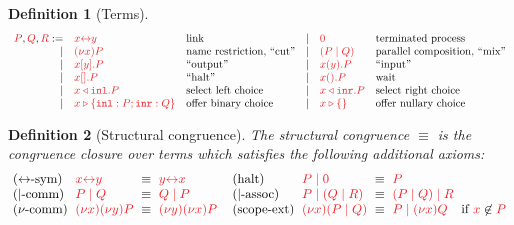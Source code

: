 \documentclass[draft,submission,copyright,creativecommons]{eptcs}
\newtheorem{definition}{Definition}
\begin{document}
\begin{definition}[Terms]\label{def:hcp-terms}
  \[
    \begin{array}{rllrll}
      \tm{P}, \tm{Q}, \tm{R}
           :=& \tm{\cpLink{x}{y}}         &\text{link}
      &  \mid& \tm{\piHalt}               &\text{terminated process}
      \\ \mid& \tm{\piNew{x}{P}}          &\text{name restriction, ``cut''}
      &  \mid& \tm{( \piPar{P}{Q} )}      &\text{parallel composition, ``mix''}
      \\ \mid& \tm{\piBoundSend{x}{y}{P}} &\text{``output''}
      &  \mid& \tm{\piRecv{x}{y}{P}}      &\text{``input''}
      \\ \mid& \tm{\piBoundSend{x}{}{P}}  &\text{``halt''}
      &  \mid& \tm{\cpWait{x}{}{P}}       &\text{wait}
      \\ \mid& \tm{\cpInl{x}{P}}          &\text{select left choice}
      &  \mid& \tm{\cpInr{x}{P}}          &\text{select right choice}
      \\ \mid& \tm{\cpCase{x}{P}{Q}}      &\text{offer binary choice}
      &  \mid& \tm{\cpAbsurd{x}}          &\text{offer nullary choice}
    \end{array}
  \]
\end{definition}

\begin{definition}[Structural congruence]\label{def:hcp-equiv}
  The structural congruence $\equiv$ is the congruence closure over terms which
  satisfies the following additional axioms:
  \[
    \setlength{\arraycolsep}{3pt}
    \begin{array}{llcllllcll}
        \cpEquivLinkComm
      & \tm{\cpLink{x}{y}}
      & \equiv
      & \tm{\cpLink{y}{x}}
      &
      &
        \hccpEquivMixHalt1
      & \tm{\piPar{P}{\piHalt}}
      & \equiv
      & \tm{P}
      &
      \\
        \hccpEquivMixComm
      & \tm{\piPar{P}{Q}}
      & \equiv
      & \tm{\piPar{Q}{P}}
      &
      &
        \hccpEquivMixAss1
      & \tm{\piPar{P}{( \piPar{Q}{R} )}}
      & \equiv
      & \tm{\piPar{( \piPar{P}{Q} )}{R}}
      &
      \\
        \hccpEquivNewComm
      & \tm{\piNew{x}{\piNew{y}{P}}}
      & \equiv
      & \tm{\piNew{y}{\piNew{x}{P}}}
      &
      &
        \hccpEquivScopeExt1
      & \tm{\piNew{x}{( \piPar{P}{Q} )}}
      & \equiv
      & \tm{\piPar{P}{\piNew{x}{Q}}}
      & \text{if }\notFreeIn{x}{P}
    \end{array}
  \]
\end{definition}
\end{document}
